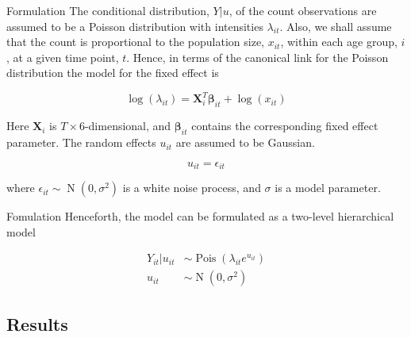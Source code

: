 \documentclass[aspectratio=169]{beamer}
\DeclareMathOperator{\N}{N}
\DeclareMathOperator{\Pois}{Pois}
\begin{document}
\begin{frame}{Formulation}
The conditional distribution, \(Y|u\), of the count observations are
assumed to be a Poisson distribution with intensities \(\lambda_{it}\).
Also, we shall assume that the count is proportional to the population
size, \(x_{it}\), within each age group, \(i\), at a given time point,
\(t\). Hence, in terms of the canonical link for the Poisson
distribution the model for the fixed effect is

\begin{equation}
  \log(\lambda_{it})=\mathbf{X}_i^T\mathbf{\beta}_{it}+\log(x_{it})
\end{equation}

Here \(\mathbf{X}_i\) is \(T\times6\)-dimensional, and
\(\mathbf{\beta}_{it}\) contains the corresponding fixed effect
parameter. The random effects \(u_{it}\) are assumed to be Gaussian.

\begin{equation}
  u_{it} = \epsilon_{it}
\end{equation}

where \(\epsilon_{it}\sim\N(0,\sigma^2)\) is a white noise process, and
\(\sigma\) is a model parameter.
\end{frame}

\begin{frame}{Fomulation}
\protect\hypertarget{fomulation}{}
Henceforth, the model can be formulated as a two-level hierarchical
model

\begin{subequations}
  \begin{alignat}{2}
    Y_{it}|u_{it} &\sim \Pois (\lambda_{it}e^{u_{it}}) \label{eq:pois_ln0} \\ 
    u_{it} &\sim \N(0,\sigma^2) \label{eq:pois_ln1}
  \end{alignat}
\end{subequations}
\end{frame}

\hypertarget{results}{%
\subsection{Results}\label{results}}
\end{document}
